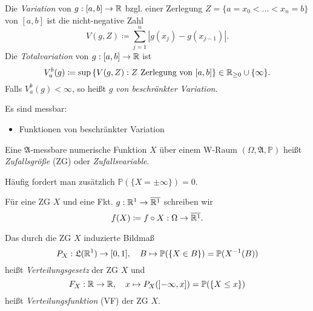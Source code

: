 \documentclass{cheat-sheet}
\newcommand{\Alg}{\mathfrak{A}} %
\newcommand{\LebAlg}{\mathfrak{L}} %
\renewcommand{\P}{\mathbb{P}} %
\renewcommand{\ER}{\overline{\R^1}} %
\begin{document}
\begin{defn}
Die \emph{Variation} von $g : [a, b] \to \mathbb{R}$ bzgl. einer Zerlegung $Z = \{ a = x_0 < ... < x_n = b \}$ von $[a, b]$ ist die nicht-negative Zahl
\[ V(g, Z) \coloneqq \sum_{j=1}^{n} |g(x_j) - g(x_{j-1})|. \]
Die \emph{Totalvariation} von $g : [a, b] \to \mathbb{R}$ ist
\[ V_a^b(g) \coloneqq \sup\left\{ V(g, Z) : Z \text{ Zerlegung von } [a, b] \right\} \in \mathbb{R}_{\ge 0} \cup \{ \infty \}. \]
Falls $V_a^b(g) < \infty$, so heißt $g$ \emph{von beschränkter Variation}.
\end{defn}

\begin{satz}
  Es sind messbar:
  \begin{itemize}
    \item Funktionen von beschränkter Variation
  \end{itemize}
\end{satz}

\begin{defn}
  Eine $\Alg$-messbare numerische Funktion $X$ über einem W-Raum $(\Omega, \Alg, \P)$ heißt \emph{Zufallsgröße} (ZG) oder \emph{Zufallsvariable}.
\end{defn}


\begin{bem}
  Häufig fordert man zusätzlich $\P(\{ X = \pm \infty \}) = 0$.
\end{bem}

\begin{nota}
  Für eine ZG $X$ und eine Fkt. $g : \R^1 \to \ER$ schreiben wir
  \[ f(X) \coloneqq f \circ X : \Omega \to \ER. \]
\end{nota}

\begin{defn}
  Das durch die ZG $X$ induzierte Bildmaß
  \[ P_X : \LebAlg(\R^1) \to [0,1], \quad B \mapsto \P(\{ X \in B \}) = \P(X^{-1}(B)) \]
  heißt \emph{Verteilungsgesetz} der ZG $X$ und
  \[ F_X : \R \to \R, \quad x \mapsto P_X(\left]-\infty, x\right]) = \P(\{ X \leq x \}) \]
  heißt \emph{Verteilungsfunktion} (VF) der ZG $X$.
\end{defn}

\end{document}
